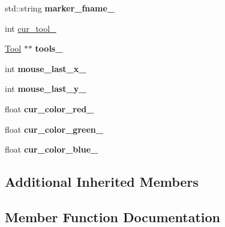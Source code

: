 \begin{DoxyCompactItemize}
\item 
std\+::string {\bfseries marker\+\_\+fname\+\_\+}\hypertarget{classimage__tools_1_1MIAApp_a291206124f9901005656d58a71b46e23}{}\label{classimage__tools_1_1MIAApp_a291206124f9901005656d58a71b46e23}

\item 
int \hyperlink{classimage__tools_1_1MIAApp_a5f86ffd9e81a59a12ff54bb7641addda}{cur\+\_\+tool\+\_\+}
\item 
\hyperlink{classimage__tools_1_1Tool}{Tool} $\ast$$\ast$ {\bfseries tools\+\_\+}\hypertarget{classimage__tools_1_1MIAApp_a31085c967b25f06fbfdcd775b7932cdf}{}\label{classimage__tools_1_1MIAApp_a31085c967b25f06fbfdcd775b7932cdf}

\item 
int {\bfseries mouse\+\_\+last\+\_\+x\+\_\+}\hypertarget{classimage__tools_1_1MIAApp_ac7e6ec4d27cc372cfb39f4f557d2426d}{}\label{classimage__tools_1_1MIAApp_ac7e6ec4d27cc372cfb39f4f557d2426d}

\item 
int {\bfseries mouse\+\_\+last\+\_\+y\+\_\+}\hypertarget{classimage__tools_1_1MIAApp_a11890db1739569d14da6172745ec38a0}{}\label{classimage__tools_1_1MIAApp_a11890db1739569d14da6172745ec38a0}

\item 
float {\bfseries cur\+\_\+color\+\_\+red\+\_\+}\hypertarget{classimage__tools_1_1MIAApp_adbcfa493342146f54d6971c2cc1d0e2b}{}\label{classimage__tools_1_1MIAApp_adbcfa493342146f54d6971c2cc1d0e2b}

\item 
float {\bfseries cur\+\_\+color\+\_\+green\+\_\+}\hypertarget{classimage__tools_1_1MIAApp_a3fa499af8daee2aef32f9cab85094947}{}\label{classimage__tools_1_1MIAApp_a3fa499af8daee2aef32f9cab85094947}

\item 
float {\bfseries cur\+\_\+color\+\_\+blue\+\_\+}\hypertarget{classimage__tools_1_1MIAApp_a9bf7b1976bd529a7647ca908de2a4b3f}{}\label{classimage__tools_1_1MIAApp_a9bf7b1976bd529a7647ca908de2a4b3f}

\end{DoxyCompactItemize}
\subsection*{Additional Inherited Members}


\subsection{Member Function Documentation}
